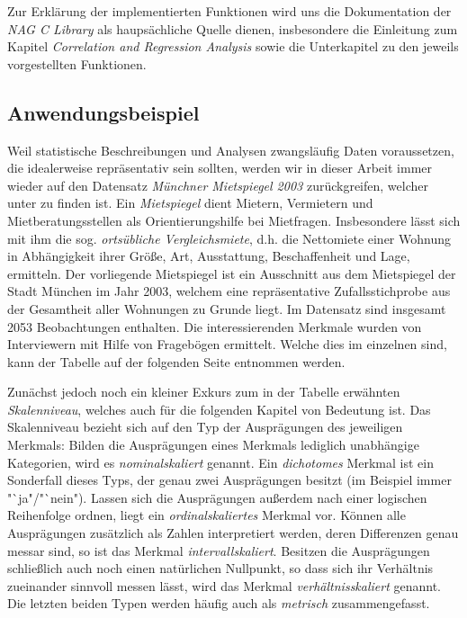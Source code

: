 Zur Erklärung der implementierten Funktionen wird uns die Dokumentation der {\it NAG C Library} als haupsächliche Quelle dienen, insbesondere die Einleitung zum Kapitel {\it Correlation and Regression Analysis} \cite{nag:intro} sowie die Unterkapitel zu den jeweils vorgestellten Funktionen.

\subsection{Anwendungsbeispiel}

Weil statistische Beschreibungen und Analysen zwangsläufig Daten voraussetzen, die idealerweise repräsentativ sein sollten, werden wir in dieser Arbeit immer wieder auf den Datensatz {\it Münchner Mietspiegel 2003} zurückgreifen, welcher unter \cite{Fahrmeir2011} zu finden ist. Ein {\it Mietspiegel} dient Mietern, Vermietern und Mietberatungsstellen als Orientierungshilfe bei Mietfragen. Insbesondere lässt sich mit ihm die sog. {\it ortsübliche Vergleichsmiete}, d.h. die Nettomiete einer Wohnung in Abhängigkeit ihrer Größe, Art, Ausstattung, Beschaffenheit und Lage, ermitteln. Der vorliegende Mietspiegel ist ein Ausschnitt aus dem Mietspiegel der Stadt München im Jahr 2003, welchem eine repräsentative Zufallsstichprobe aus der Gesamtheit aller Wohnungen zu Grunde liegt.  Im Datensatz sind insgesamt 2053 Beobachtungen enthalten. Die interessierenden Merkmale wurden von Interviewern mit Hilfe von Fragebögen ermittelt. Welche dies im einzelnen sind, kann der Tabelle auf der folgenden Seite entnommen werden.

Zunächst jedoch noch ein kleiner Exkurs zum in der Tabelle erwähnten {\it Skalenniveau}, welches auch für die folgenden Kapitel von Bedeutung ist. Das Skalenniveau bezieht sich auf den Typ der Ausprägungen des jeweiligen Merkmals: Bilden die Ausprägungen eines Merkmals lediglich unabhängige Kategorien, wird es {\it nominalskaliert} genannt. Ein {\it dichotomes} Merkmal ist ein Sonderfall dieses Typs, der genau zwei Ausprägungen besitzt (im Beispiel immer "`ja"/"`nein"). Lassen sich die Ausprägungen außerdem nach einer logischen Reihenfolge ordnen, liegt ein {\it ordinalskaliertes} Merkmal vor. Können alle Ausprägungen zusätzlich als Zahlen interpretiert werden, deren Differenzen genau messar sind, so ist das Merkmal {\it intervallskaliert}. Besitzen die Ausprägungen schließlich auch noch einen natürlichen Nullpunkt, so dass sich ihr Verhältnis zueinander sinnvoll messen lässt, wird das Merkmal {\it verhältnisskaliert} genannt. Die letzten beiden Typen werden häufig auch als {\it metrisch} zusammengefasst.\\

